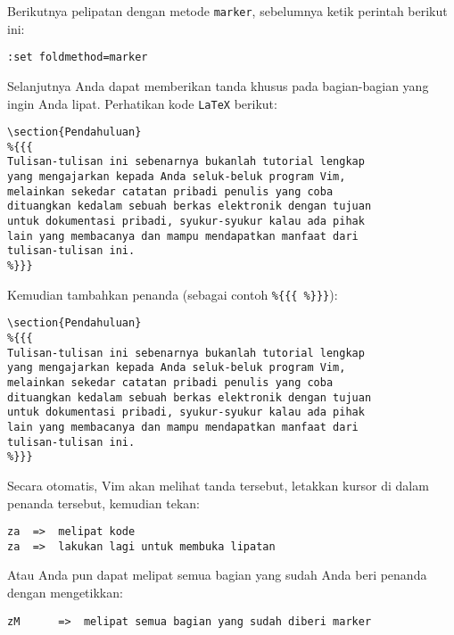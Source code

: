\documentclass{article}
\begin{document}
Berikutnya pelipatan dengan metode \verb=marker=, sebelumnya
ketik perintah berikut ini:

\begin{verbatim}
:set foldmethod=marker
\end{verbatim}

Selanjutnya Anda dapat memberikan tanda khusus pada
bagian-bagian yang ingin Anda lipat. Perhatikan kode
\verb=LaTeX= berikut:

\begin{verbatim}
\section{Pendahuluan}
%{{{
Tulisan-tulisan ini sebenarnya bukanlah tutorial lengkap
yang mengajarkan kepada Anda seluk-beluk program Vim,
melainkan sekedar catatan pribadi penulis yang coba
dituangkan kedalam sebuah berkas elektronik dengan tujuan
untuk dokumentasi pribadi, syukur-syukur kalau ada pihak
lain yang membacanya dan mampu mendapatkan manfaat dari
tulisan-tulisan ini.
%}}}
\end{verbatim}

Kemudian tambahkan penanda (sebagai contoh 
\verb=%{{{ %}}}=):

\begin{verbatim}
\section{Pendahuluan}
%{{{
Tulisan-tulisan ini sebenarnya bukanlah tutorial lengkap
yang mengajarkan kepada Anda seluk-beluk program Vim,
melainkan sekedar catatan pribadi penulis yang coba
dituangkan kedalam sebuah berkas elektronik dengan tujuan
untuk dokumentasi pribadi, syukur-syukur kalau ada pihak
lain yang membacanya dan mampu mendapatkan manfaat dari
tulisan-tulisan ini.
%}}}
\end{verbatim}

Secara otomatis, Vim akan melihat tanda tersebut, letakkan
kursor di dalam penanda tersebut, kemudian tekan:

\begin{verbatim}
za  =>  melipat kode
za  =>  lakukan lagi untuk membuka lipatan
\end{verbatim}

Atau Anda pun dapat melipat semua bagian yang sudah Anda
beri penanda dengan mengetikkan:

\begin{verbatim}
zM      =>  melipat semua bagian yang sudah diberi marker
\end{verbatim}
\end{document}

